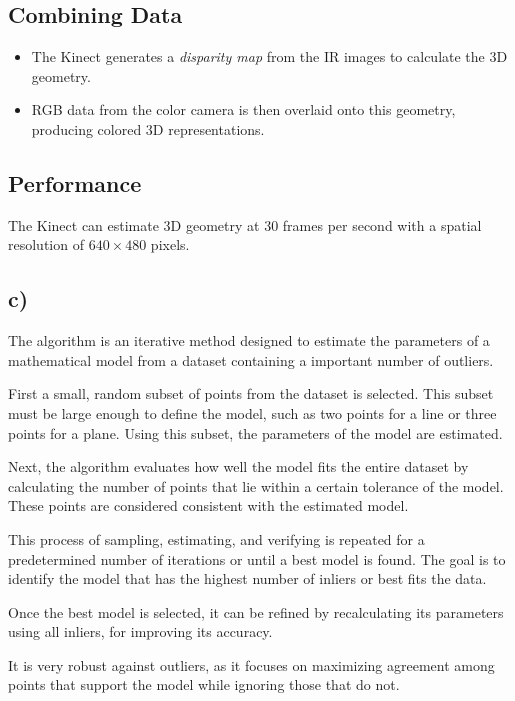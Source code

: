 \documentclass[template,12pt,a4paper,enabledeprecatedfontcommands]{template}
\begin{document}
\subsection*{Combining Data}
\begin{itemize}
    \item The Kinect generates a \textit{disparity map} from the IR images to calculate the 3D geometry.
    \item RGB data from the color camera is then overlaid onto this geometry, producing colored 3D representations.
\end{itemize}

\subsection*{Performance}
The Kinect can estimate 3D geometry at 30 frames per second with a spatial resolution of $640 \times 480$ pixels.


\subsection{c)}

The algorithm is an iterative method designed to estimate the parameters of a mathematical model from a dataset containing a important number of outliers.

\noindent First a small, random subset of points from the dataset is selected. This subset must be large enough to define the model, such as two points for a line or three points for a plane. Using this subset, the parameters of the model are estimated.

\noindent Next, the algorithm evaluates how well the model fits the entire dataset by calculating the number of points that lie within a certain tolerance of the model. These points are considered consistent with the estimated model.

\noindent This process of sampling, estimating, and verifying is repeated for a predetermined number of iterations or until a best model is found. The goal is to identify the model that has the highest number of inliers or best fits the data.

\noindent Once the best model is selected, it can be refined by recalculating its parameters using all inliers, for improving its accuracy.

\noindent It is very robust against outliers, as it focuses on maximizing agreement among points that support the model while ignoring those that do not.
\end{document}
